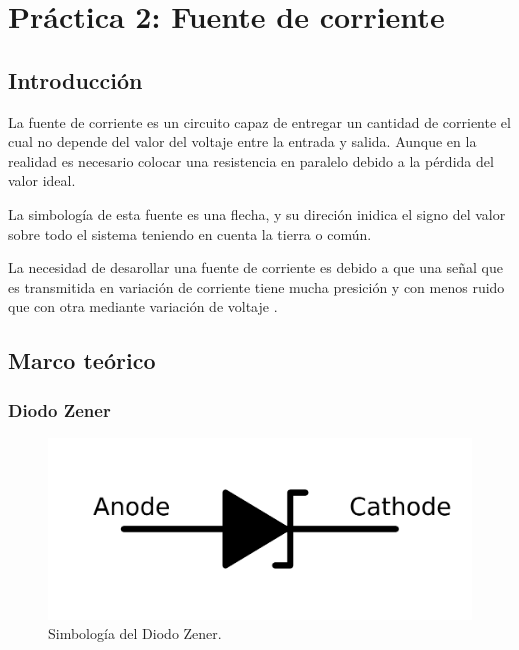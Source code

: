 \clearpage

\section{Práctica 2: Fuente de corriente}



\subsection{Introducción}
La fuente de corriente es un circuito capaz de entregar un cantidad de corriente el cual no depende del valor del voltaje entre la entrada y salida. Aunque en la realidad es necesario colocar una resistencia en paralelo debido a la pérdida del valor ideal.

La simbología de esta fuente es una flecha, y su direción inidica el signo del valor sobre todo el sistema teniendo en cuenta la tierra o común.

La necesidad de desarollar una fuente de corriente es debido a que una señal que es transmitida en variación de corriente tiene mucha presición y con menos ruido que con otra mediante variación de voltaje \parencite{routimo2007comparison}.

\subsection{Marco teórico}
\subsubsection*{Diodo Zener}

\begin{figure}[h]
    \centering
    \includegraphics[scale=0.2]{media/1024px-Zener_diode_symbol.svg.png}
    \caption{Simbología del Diodo Zener.}
    \label{Fig: Simbologia del Diodo Zener}
\end{figure}


